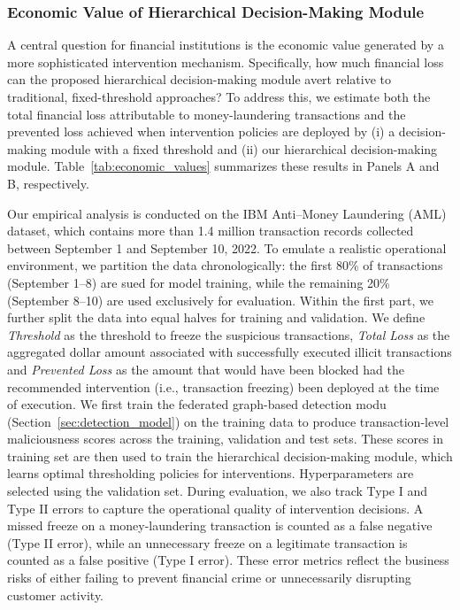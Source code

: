 \documentclass[11pt,english]{article}
\newcommand{\lc}[1]{{\textsf{\textcolor{blue}{[LC: #1]}}}}
\begin{document}
\subsubsection{Economic Value of Hierarchical Decision-Making Module}
A central question for financial institutions is the economic value generated by a more sophisticated intervention mechanism. Specifically, how much financial loss can the proposed hierarchical decision-making module avert relative to traditional, fixed-threshold approaches? To address this, we estimate both the total financial loss attributable to money-laundering transactions and the prevented loss achieved when intervention policies are deployed by (i) a decision-making module with a fixed threshold and (ii) our hierarchical decision-making module. Table~\ref{tab:economic_values} summarizes these results in Panels A and B, respectively.

Our empirical analysis is conducted on the IBM Anti–Money Laundering (AML) dataset, which contains more than 1.4 million transaction records collected between September 1 and September 10, 2022. To emulate a realistic operational environment, we partition the data chronologically: the first 80\% of transactions (September 1–8) are sued for model training, while the remaining 20\% (September 8–10) are used exclusively for evaluation. Within the first part, we further split the data into equal halves for training and validation. We define  \textit{Threshold} as the threshold to freeze the suspicious transactions, \textit{Total Loss} as the aggregated dollar amount associated with successfully executed illicit transactions and \textit{Prevented Loss} as the amount that would have been blocked had the recommended intervention (i.e., transaction freezing) been deployed at the time of execution. We first train the federated graph-based detection modu (Section~\ref{sec:detection_model}) on the training data to produce transaction-level maliciousness scores across the training, validation and test sets. These scores in training set are then used to train the hierarchical decision-making module, which learns optimal thresholding policies for interventions. Hyperparameters are selected using the validation set. During evaluation, we also track Type I and Type II errors to capture the operational quality of intervention decisions. A missed freeze on a money-laundering transaction is counted as a false negative (Type II error), while an unnecessary freeze on a legitimate transaction is counted as a false positive (Type I error). These error metrics reflect the business risks of either failing to prevent financial crime or unnecessarily disrupting customer activity.
\end{document}
